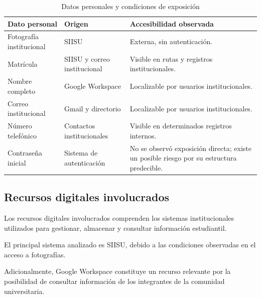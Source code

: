 \documentclass[12pt]{article}
\begin{document}
\begin{table}[H]
\centering
\caption{Datos personales y condiciones de exposición}
\label{tab:datos_personales}
\small
\begin{tabularx}{\textwidth}{|X|X|X|}
\hline
\textbf{Dato personal} &
\textbf{Origen} &
\textbf{Accesibilidad observada} \\ \hline

Fotografía institucional &
SIISU &
Externa, sin autenticación. \\ \hline

Matrícula &
SIISU y correo institucional &
Visible en rutas y registros
institucionales. \\ \hline

Nombre completo &
Google Workspace &
Localizable por usuarios
institucionales. \\ \hline

Correo institucional &
Gmail y directorio &
Localizable por usuarios
institucionales. \\ \hline

Número telefónico &
Contactos institucionales &
Visible en determinados
registros internos. \\ \hline

Contraseña inicial &
Sistema de autenticación &
No se observó exposición
directa; existe un posible
riesgo por su estructura
predecible. \\ \hline

\end{tabularx}
\end{table}

\subsection{Recursos digitales involucrados}

Los recursos digitales involucrados
comprenden los sistemas institucionales
utilizados para gestionar, almacenar
y consultar información estudiantil.

El principal sistema analizado es SIISU,
debido a las condiciones observadas
en el acceso a fotografías.

Adicionalmente, Google Workspace
constituye un recurso relevante
por la posibilidad de consultar
información de los integrantes
de la comunidad universitaria.
\end{document}
